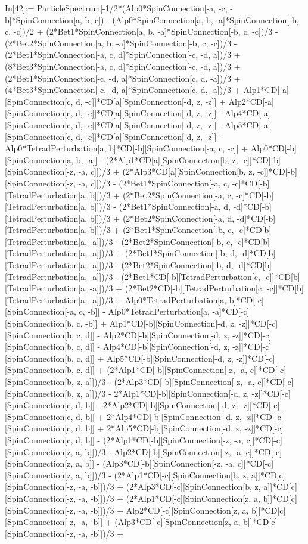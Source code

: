 In[42]:= ParticleSpectrum[-1/2*(Alp0*SpinConnection[-a, -c, -b]*SpinConnection[a, b, c]) - (Alp0*SpinConnection[a, b, -a]*SpinConnection[-b, c, -c])/2 + (2*Bet1*SpinConnection[a, b, -a]*SpinConnection[-b, c, -c])/3 - (2*Bet2*SpinConnection[a, b, -a]*SpinConnection[-b, c, -c])/3 - (2*Bet1*SpinConnection[-a, c, d]*SpinConnection[-c, -d, a])/3 + (8*Bet3*SpinConnection[-a, c, d]*SpinConnection[-c, -d, a])/3 + (2*Bet1*SpinConnection[-c, -d, a]*SpinConnection[c, d, -a])/3 + (4*Bet3*SpinConnection[-c, -d, a]*SpinConnection[c, d, -a])/3 + Alp1*CD[-a][SpinConnection[c, d, -c]]*CD[a][SpinConnection[-d, z, -z]] + Alp2*CD[-a][SpinConnection[c, d, -c]]*CD[a][SpinConnection[-d, z, -z]] - Alp4*CD[-a][SpinConnection[c, d, -c]]*CD[a][SpinConnection[-d, z, -z]] - Alp5*CD[-a][SpinConnection[c, d, -c]]*CD[a][SpinConnection[-d, z, -z]] - Alp0*TetradPerturbation[a, b]*CD[-b][SpinConnection[-a, c, -c]] + Alp0*CD[-b][SpinConnection[a, b, -a]] - (2*Alp1*CD[a][SpinConnection[b, z, -c]]*CD[-b][SpinConnection[-z, -a, c]])/3 + (2*Alp3*CD[a][SpinConnection[b, z, -c]]*CD[-b][SpinConnection[-z, -a, c]])/3 - (2*Bet1*SpinConnection[-a, c, -c]*CD[-b][TetradPerturbation[a, b]])/3 + (2*Bet2*SpinConnection[-a, c, -c]*CD[-b][TetradPerturbation[a, b]])/3 - (2*Bet1*SpinConnection[-a, d, -d]*CD[-b][TetradPerturbation[a, b]])/3 + (2*Bet2*SpinConnection[-a, d, -d]*CD[-b][TetradPerturbation[a, b]])/3 + (2*Bet1*SpinConnection[-b, c, -c]*CD[b][TetradPerturbation[a, -a]])/3 - (2*Bet2*SpinConnection[-b, c, -c]*CD[b][TetradPerturbation[a, -a]])/3 + (2*Bet1*SpinConnection[-b, d, -d]*CD[b][TetradPerturbation[a, -a]])/3 - (2*Bet2*SpinConnection[-b, d, -d]*CD[b][TetradPerturbation[a, -a]])/3 - (2*Bet1*CD[-b][TetradPerturbation[c, -c]]*CD[b][TetradPerturbation[a, -a]])/3 + (2*Bet2*CD[-b][TetradPerturbation[c, -c]]*CD[b][TetradPerturbation[a, -a]])/3 + Alp0*TetradPerturbation[a, b]*CD[-c][SpinConnection[-a, c, -b]] - Alp0*TetradPerturbation[a, -a]*CD[-c][SpinConnection[b, c, -b]] + Alp1*CD[-b][SpinConnection[-d, z, -z]]*CD[-c][SpinConnection[b, c, d]] - Alp2*CD[-b][SpinConnection[-d, z, -z]]*CD[-c][SpinConnection[b, c, d]] - Alp4*CD[-b][SpinConnection[-d, z, -z]]*CD[-c][SpinConnection[b, c, d]] + Alp5*CD[-b][SpinConnection[-d, z, -z]]*CD[-c][SpinConnection[b, c, d]] + (2*Alp1*CD[-b][SpinConnection[-z, -a, c]]*CD[-c][SpinConnection[b, z, a]])/3 - (2*Alp3*CD[-b][SpinConnection[-z, -a, c]]*CD[-c][SpinConnection[b, z, a]])/3 - 2*Alp1*CD[-b][SpinConnection[-d, z, -z]]*CD[-c][SpinConnection[c, d, b]] - 2*Alp2*CD[-b][SpinConnection[-d, z, -z]]*CD[-c][SpinConnection[c, d, b]] + 2*Alp4*CD[-b][SpinConnection[-d, z, -z]]*CD[-c][SpinConnection[c, d, b]] + 2*Alp5*CD[-b][SpinConnection[-d, z, -z]]*CD[-c][SpinConnection[c, d, b]] - (2*Alp1*CD[-b][SpinConnection[-z, -a, c]]*CD[-c][SpinConnection[z, a, b]])/3 - Alp2*CD[-b][SpinConnection[-z, -a, c]]*CD[-c][SpinConnection[z, a, b]] - (Alp3*CD[-b][SpinConnection[-z, -a, c]]*CD[-c][SpinConnection[z, a, b]])/3 - (2*Alp1*CD[-c][SpinConnection[b, z, a]]*CD[c][SpinConnection[-z, -a, -b]])/3 + (2*Alp3*CD[-c][SpinConnection[b, z, a]]*CD[c][SpinConnection[-z, -a, -b]])/3 + (2*Alp1*CD[-c][SpinConnection[z, a, b]]*CD[c][SpinConnection[-z, -a, -b]])/3 + Alp2*CD[-c][SpinConnection[z, a, b]]*CD[c][SpinConnection[-z, -a, -b]] + (Alp3*CD[-c][SpinConnection[z, a, b]]*CD[c][SpinConnection[-z, -a, -b]])/3 + 